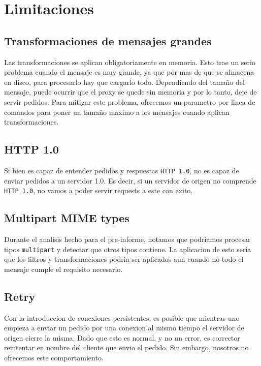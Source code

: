 \documentclass[11pt,a4paper,titlepage]{article}
\begin{document}

\section{Limitaciones}

    \subsection{Transformaciones de mensajes grandes}
    Las transformaciones se aplican obligatoriamente en memoria.
    Esto trae un serio problema cuando el mensaje es muy grande, ya que por mas de que se almacena en disco, para procesarlo hay que cargarlo todo.
    Dependiendo del tamaño del mensaje, puede ocurrir que el proxy se quede sin memoria y por lo tanto, deje de servir pedidos.
    Para mitigar este problema, ofrecemos un parametro por linea de comandos para poner un tamaño maximo a los mensajes cuando aplican transformaciones.

    \subsection{HTTP 1.0}
    Si bien \duta es capaz de entender pedidos y respuestas \texttt{HTTP 1.0}, no es capaz de enviar pedidos a un servidor 1.0.
    Es decir, si un servidor de origen no comprende \texttt{HTTP 1.0}, no vamos a poder servir requests a este con exito.

    \subsection{Multipart MIME types}
    Durante el analisis hecho para el pre-informe, notamos que podriamos procesar tipos \texttt{multipart} y detectar que otros tipos contiene.
    La aplicacion de esto seria que los filtros y transformaciones podria ser aplicados aun cuando no todo el mensaje cumple el requisito necesario.

    \subsection{Retry}
    Con la introduccion de conexiones persistentes, es posible que mientras uno empieza a enviar un pedido por una conexion al mismo tiempo el servidor de origen cierre la misma.
    Dado que esto es normal, y no un error, es corrector reintentar en nombre del cliente que envio el pedido.
    Sin embargo, nosotros no ofrecemos este comportamiento.
\end{document}
